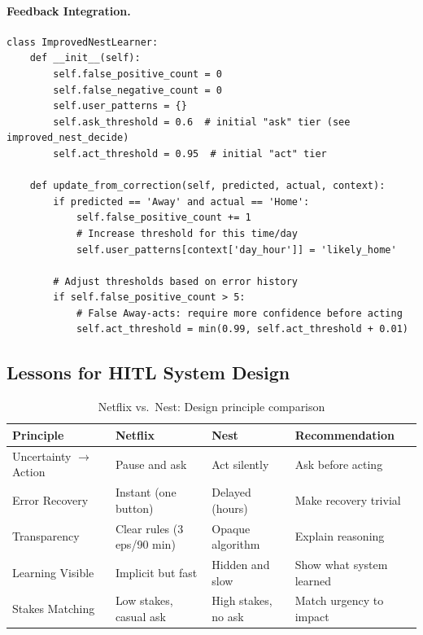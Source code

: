 \paragraph{Feedback Integration.}
\begin{lstlisting}[style=python, caption={ImprovedNestLearner with feedback integration}]
class ImprovedNestLearner:
    def __init__(self):
        self.false_positive_count = 0
        self.false_negative_count = 0
        self.user_patterns = {}
        self.ask_threshold = 0.6  # initial "ask" tier (see improved_nest_decide)
        self.act_threshold = 0.95  # initial "act" tier

    def update_from_correction(self, predicted, actual, context):
        if predicted == 'Away' and actual == 'Home':
            self.false_positive_count += 1
            # Increase threshold for this time/day
            self.user_patterns[context['day_hour']] = 'likely_home'

        # Adjust thresholds based on error history
        if self.false_positive_count > 5:
            # False Away-acts: require more confidence before acting
            self.act_threshold = min(0.99, self.act_threshold + 0.01)
\end{lstlisting}

\subsection{Lessons for HITL System Design}

\begin{table}[htbp]
\caption{Netflix vs.\ Nest: Design principle comparison}
\label{tab:netflix-nest-comparison}
\centering
\begin{tabularx}{\textwidth}{@{}YYYY@{}}
\toprule
\textbf{Principle} & \textbf{Netflix} & \textbf{Nest} & \textbf{Recommendation} \\
\midrule
Uncertainty $\to$ Action & Pause and ask & Act silently & Ask before acting \\
Error Recovery & Instant (one button) & Delayed (hours) & Make recovery trivial \\
Transparency & Clear rules (3 eps/90 min) & Opaque algorithm & Explain reasoning \\
Learning Visible & Implicit but fast & Hidden and slow & Show what system learned \\
Stakes Matching & Low stakes, casual ask & High stakes, no ask & Match urgency to impact \\
\bottomrule
\end{tabularx}
\end{table}

